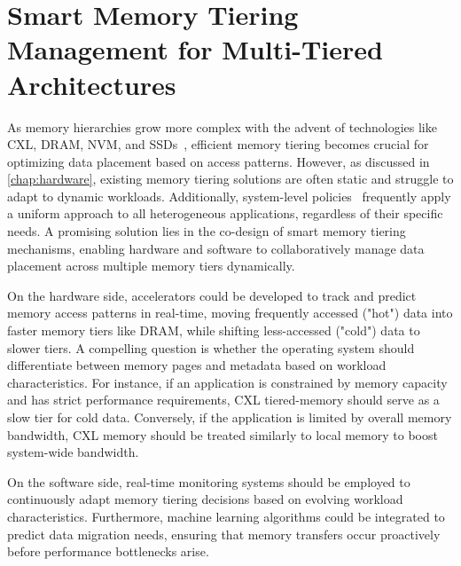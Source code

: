 \section{Smart Memory Tiering Management for Multi-Tiered Architectures}
As memory hierarchies grow more complex with the advent of technologies like CXL, DRAM, NVM, and SSDs~\cite{zhong2024managing}, efficient memory tiering becomes crucial for optimizing data placement based on access patterns. However, as discussed in \ref{chap:hardware}, existing memory tiering solutions are often static and struggle to adapt to dynamic workloads. Additionally, system-level policies~\cite{hot, tpp} frequently apply a uniform approach to all heterogeneous applications, regardless of their specific needs. A promising solution lies in the co-design of smart memory tiering mechanisms, enabling hardware and software to collaboratively manage data placement across multiple memory tiers dynamically.

On the hardware side, accelerators could be developed to track and predict memory access patterns in real-time, moving frequently accessed ("hot") data into faster memory tiers like DRAM, while shifting less-accessed ("cold") data to slower tiers. A compelling question is whether the operating system should differentiate between memory pages and metadata based on workload characteristics. For instance, if an application is constrained by memory capacity and has strict performance requirements, CXL tiered-memory should serve as a slow tier for cold data. Conversely, if the application is limited by overall memory bandwidth, CXL memory should be treated similarly to local memory to boost system-wide bandwidth.

On the software side, real-time monitoring systems should be employed to continuously adapt memory tiering decisions based on evolving workload characteristics. Furthermore, machine learning algorithms could be integrated to predict data migration needs, ensuring that memory transfers occur proactively before performance bottlenecks arise.









